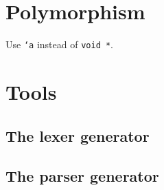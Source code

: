 \newpage

\tableofcontents
\newpage

\section{Polymorphism}
\hypertarget{polymorphism}{}

Use \texttt{`a} instead of \texttt{void *}.


\appendix





\section{Tools}

\subsection{The lexer generator}
\subsection{The parser generator}



\printindex



